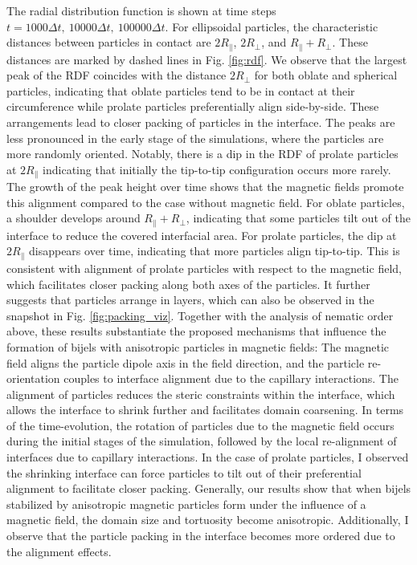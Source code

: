 The radial distribution function is shown at time steps
\(t=1000\Delta t,\ 10000\Delta t,\ 100000\Delta t\). For ellipsoidal
particles, the characteristic distances between particles in contact are
\(2R_{\parallel}\), \(2R_{\perp}\), and \(R_{\parallel} + R_{\perp}\).
These distances are marked by dashed lines in Fig. \ref{fig:rdf}. We
observe that the largest peak of the RDF coincides with the distance
\(2R_\perp\) for both oblate and spherical particles, indicating that
oblate particles tend to be in contact at their circumference while
prolate particles preferentially align side-by-side. These arrangements
lead to closer packing of particles in the interface. The peaks are less
pronounced in the early stage of the simulations, where the particles
are more randomly oriented. Notably, there is a dip in the RDF of
prolate particles at \(2R_\parallel\) indicating that initially the
tip-to-tip configuration occurs more rarely. The growth of the peak
height over time shows that the magnetic fields promote this alignment
compared to the case without magnetic field. For oblate particles, a
shoulder develops around \(R_\parallel+R_\perp\), indicating that some
particles tilt out of the interface to reduce the covered interfacial
area. For prolate particles, the dip at \(2R_\parallel\) disappears over
time, indicating that more particles align tip-to-tip. This is
consistent with alignment of prolate particles with respect to the
magnetic field, which facilitates closer packing along both axes of the
particles. It further suggests that particles arrange in layers, which can also be observed in the snapshot in Fig.
\ref{fig:packing_viz}. Together with the analysis of nematic order
above, these results substantiate the proposed mechanisms that influence
the formation of bijels with anisotropic particles in magnetic fields:
The magnetic field aligns the particle dipole axis in the field
direction, and the particle re-orientation couples to interface
alignment due to the capillary interactions. The alignment of particles
reduces the steric constraints within the interface, which allows the
interface to shrink further and facilitates domain coarsening. In terms
of the time-evolution, the rotation of particles due to the magnetic
field occurs during the initial stages of the simulation, followed by
the local re-alignment of interfaces due to capillary interactions. In
the case of prolate particles, I observed the shrinking interface can
force particles to tilt out of their preferential alignment to facilitate
closer packing. Generally, our results show that when bijels stabilized
by anisotropic magnetic particles form under the influence of a magnetic
field, the domain size and tortuosity become anisotropic. Additionally,
I observe that the particle packing in the interface becomes more
ordered due to the alignment effects.


